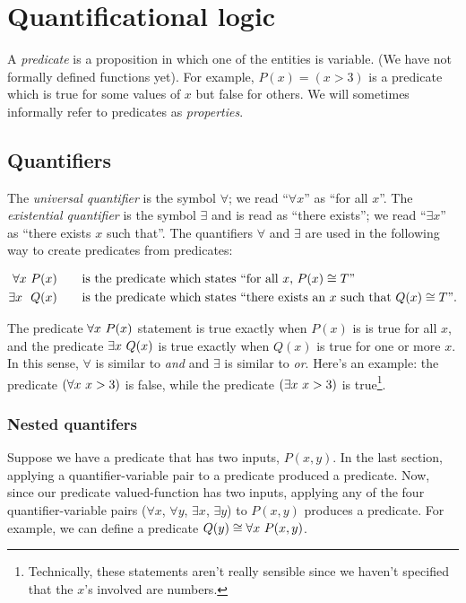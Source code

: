 \newpage

\section{Quantificational logic}

A \textit{predicate} is a proposition in which one of the entities is variable. (We have not formally defined functions yet). For example, $P(x) = (x > 3)$ is a predicate which is true for some values of $x$ but false for others. We will sometimes informally refer to predicates as \textit{properties}.

\subsection*{Quantifiers}

The \textit{universal quantifier} is the symbol $\forall$; we read ``$\forall x$'' as ``for all $x$''. The \textit{existential quantifier} is the symbol $\exists$ and is read as ``there exists''; we read ``$\exists x$'' as ``there exists $x$ such that''. The quantifiers $\forall$ and $\exists$ are used in the following way to create predicates from predicates:

\begin{align*}
    \forall x \text{ } P(x) &\qquad \text{is the predicate which states ``for all $x$, $P(x) \cong T$''} \\
    \exists x \text{ } \text{ } Q(x) &\qquad \text{is the predicate which states ``there exists an $x$ such that $Q(x) \cong T$''}.
\end{align*}

The predicate $\forall x \text{ } P(x)$ statement is true exactly when $P(x)$ is is true for all $x$, and the predicate $\exists x \text{ } Q(x)$ is true exactly when $Q(x)$ is true for one or more $x$. In this sense, $\forall$ is similar to \textit{and} and $\exists$ is similar to \textit{or}. Here's an example: the predicate $(\forall x \text{ } x > 3)$ is false, while the predicate $(\exists x \text{ } x > 3)$ is true\footnote{Technically, these statements aren't really sensible since we haven't specified that the $x$'s involved are numbers.}.

\subsubsection{Nested quantifers}

Suppose we have a predicate that has two inputs, $P(x, y)$. In the last section, applying a quantifier-variable pair to a predicate produced a predicate. Now, since our predicate valued-function has two inputs, applying any of the four quantifier-variable pairs ($\forall x$, $\forall y$, $\exists x$, $\exists y$) to $P(x, y)$ produces a predicate. For example, we can define a predicate $Q(y) \cong \forall x \text{ } P(x, y)$.

